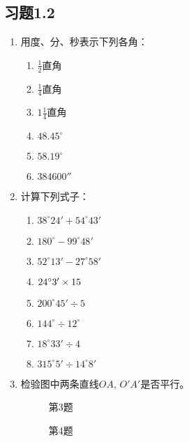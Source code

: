 \subsection*{习题1.2}
\begin{enumerate}
	\item 用度、分、秒表示下列各角：
\begin{multicols}{3}
\begin{enumerate}
	\item $\frac{1}{2}$直角
	\item  $\frac{1}{4}$直角
	\item $1\frac{1}{4}$直角
	\item $48.45^{\circ}$
\item 	$58.19^{\circ}$
\item $384600''$
\end{enumerate}
\end{multicols}
\item 计算下列式子：
\begin{multicols}{2}
\begin{enumerate}
\item $38^{\circ}24'+54^{\circ}43'$
\item $180^{\circ}-99^{\circ}48'$
\item $52^{\circ}13'-27^{\circ}58'$
\item $24^{\circ}3'\times 15$
\item $200^{\circ}45'\div 5$
\item $144^{\circ}\div 12^{\circ}$
\item $18^{\circ}33'\div 4$
\item $315^{\circ}5'\div 14^{\circ}8'$
\end{enumerate}
\end{multicols}

\item 检验图中两条直线$OA$, $O'A'$是否平行。

\begin{figure}[htp]\centering
    \begin{minipage}[t]{0.48\textwidth}
    \centering
{}
    \caption*{第3题}
    \end{minipage}
    \begin{minipage}[t]{0.48\textwidth}
    \centering
    \caption*{第4题}
    \end{minipage}
    \end{figure}


\end{enumerate}
